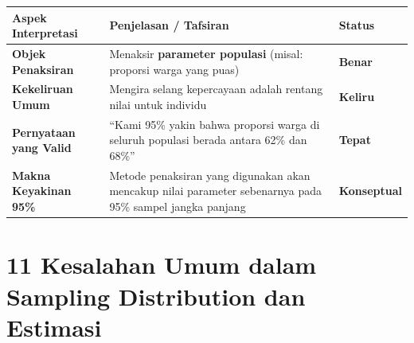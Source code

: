 \documentclass[
  indonesian,
  letterpaper,
]{book}
\newcounter{none} %
\begin{document}
{\def\LTcaptype{none} %
\begin{longtable}[]{@{}
  >{\raggedright\arraybackslash}p{}
  >{\raggedright\arraybackslash}p{}
  >{\centering\arraybackslash}p{}@{}}
\toprule\noalign{}
\begin{minipage}[b]{\linewidth}\raggedright
Aspek Interpretasi
\end{minipage} & \begin{minipage}[b]{\linewidth}\raggedright
Penjelasan / Tafsiran
\end{minipage} & \begin{minipage}[b]{\linewidth}\centering
Status
\end{minipage} \\
\midrule\noalign{}
\endhead
\bottomrule\noalign{}
\endlastfoot
\textbf{Objek Penaksiran} & Menaksir \textbf{parameter populasi} (misal:
proporsi warga yang puas) & \textbf{Benar} \\
\textbf{Kekeliruan Umum} & Mengira selang kepercayaan adalah rentang
nilai untuk individu & \textbf{Keliru} \\
\textbf{Pernyataan yang Valid} & ``Kami 95\% yakin bahwa proporsi warga
di seluruh populasi berada antara 62\% dan 68\%'' & \textbf{Tepat} \\
\textbf{Makna Keyakinan 95\%} & Metode penaksiran yang digunakan akan
mencakup nilai parameter sebenarnya pada 95\% sampel jangka panjang &
\textbf{Konseptual} \\
\end{longtable}
}


\chapter{11 Kesalahan Umum dalam Sampling Distribution dan
Estimasi}\label{kesalahan-umum-dalam-sampling-distribution-dan-estimasi}
\end{document}
